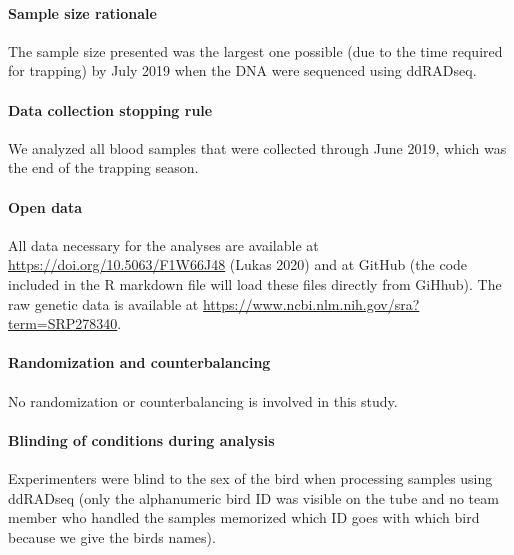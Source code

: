 \documentclass[]{article}
\let\oldparagraph\paragraph
\renewcommand{\paragraph}[1]{\oldparagraph{#1}\mbox{}}
\begin{document}
\hypertarget{sample-size-rationale}{%
\paragraph{Sample size rationale}\label{sample-size-rationale}}

The sample size presented was the largest one possible (due to the time
required for trapping) by July 2019 when the DNA were sequenced using
ddRADseq.

\hypertarget{data-collection-stopping-rule}{%
\paragraph{Data collection stopping
rule}\label{data-collection-stopping-rule}}

We analyzed all blood samples that were collected through June 2019,
which was the end of the trapping season.

\hypertarget{open-data}{%
\paragraph{Open data}\label{open-data}}

All data necessary for the analyses are available at
\url{https://doi.org/10.5063/F1W66J48} (Lukas 2020) and at GitHub (the
code included in the R markdown file will load these files directly from
GiHhub). The raw genetic data is available at
\url{https://www.ncbi.nlm.nih.gov/sra?term=SRP278340}.

\hypertarget{randomization-and-counterbalancing}{%
\paragraph{Randomization and
counterbalancing}\label{randomization-and-counterbalancing}}

No randomization or counterbalancing is involved in this study.

\hypertarget{blinding-of-conditions-during-analysis}{%
\paragraph{Blinding of conditions during
analysis}\label{blinding-of-conditions-during-analysis}}

Experimenters were blind to the sex of the bird when processing samples
using ddRADseq (only the alphanumeric bird ID was visible on the tube
and no team member who handled the samples memorized which ID goes with
which bird because we give the birds names).
\end{document}
